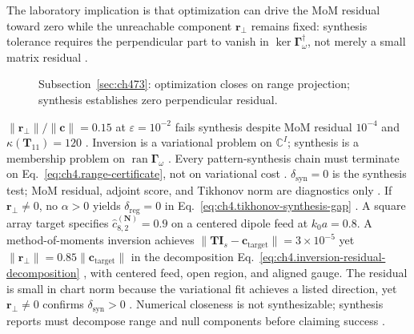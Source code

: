 The laboratory implication is that optimization can drive the MoM residual toward zero while the unreachable component $\mathbf{r}_{\perp}$ remains fixed: synthesis tolerance requires the perpendicular part to vanish in $\ker\boldsymbol{\Gamma}_\omega^{\dagger}$, not merely a small matrix residual \cite{stratton1941}.
\begin{figure}[t]
\centering
{}
\caption{Subsection~\ref{sec:ch473}: optimization closes on range projection; synthesis establishes zero perpendicular residual.}
\label{fig:ch4.synthesis-certificate-chain}
\end{figure}
\(\|\mathbf{r}_{\perp}\|/\|\mathbf{c}\|=0.15\) at \(\varepsilon=10^{-2}\) fails synthesis despite MoM residual \(10^{-4}\) and
\(\kappa(\mathbf{T}_{11})=120\) \cite{harrington2001}.
Inversion is a variational problem on \(\mathbb{C}^{I}\); synthesis is a membership problem on \(\operatorname{ran}\boldsymbol{\Gamma}_\omega\)
\cite{stratton1941}. Every pattern-synthesis chain must terminate on Eq.~\eqref{eq:ch4.range-certificate}, not on variational
cost \cite{hansen1988}. \(\delta_{\mathrm{syn}}=0\) is the synthesis test; MoM residual, adjoint score, and Tikhonov norm are diagnostics only
\cite{stratton1941}.
\label{cor:ch4.tikhonov-unreachable}
If \(\mathbf{r}_{\perp}\neq0\), no \(\alpha>0\) yields \(\delta_{\mathrm{reg}}=0\) in Eq.~\eqref{eq:ch4.tikhonov-synthesis-gap}
\cite{harrington2001}.
A square array target specifies $\widehat{c}_{8,2}^{(\mathbf{N})}=0.9$ on a centered dipole feed at $k_{0}a=0.8$. A method-of-moments inversion achieves $\|\mathbf{T}\mathbf{I}_{s}-\mathbf{c}_{\mathrm{target}}\|=3\times10^{-5}$ yet $\|\mathbf{r}_{\perp}\|=0.85\|\mathbf{c}_{\mathrm{target}}\|$ in the decomposition Eq.~\eqref{eq:ch4.inversion-residual-decomposition} \cite{harrington2001}, with centered feed, open region, and aligned gauge. The residual is small in chart norm because the variational fit achieves a listed direction, yet $\mathbf{r}_{\perp}\neq0$ confirms $\delta_{\mathrm{syn}}>0$ \cite{devaney2004}. Numerical closeness is not synthesizable; synthesis reports must decompose range and null components before claiming success \cite{stratton1941}.
